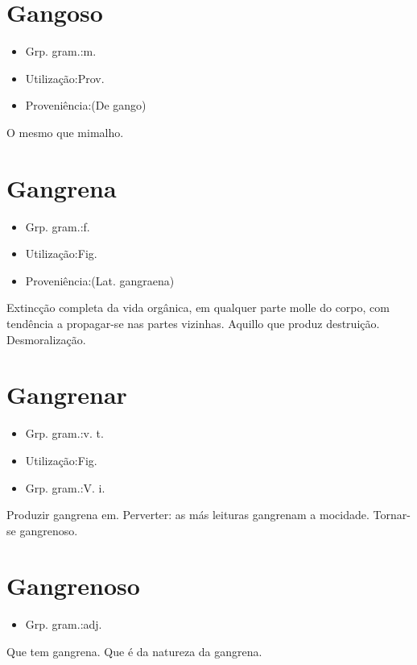 \section{Gangoso}
\begin{itemize}
\item {Grp. gram.:m.}
\end{itemize}
\begin{itemize}
\item {Utilização:Prov.}
\end{itemize}
\begin{itemize}
\item {Proveniência:(De \textunderscore gango\textunderscore )}
\end{itemize}
O mesmo que \textunderscore mimalho\textunderscore .
\section{Gangrena}
\begin{itemize}
\item {Grp. gram.:f.}
\end{itemize}
\begin{itemize}
\item {Utilização:Fig.}
\end{itemize}
\begin{itemize}
\item {Proveniência:(Lat. \textunderscore gangraena\textunderscore )}
\end{itemize}
Extincção completa da vida orgânica, em qualquer parte molle do corpo, com tendência a propagar-se nas partes vizinhas.
Aquillo que produz destruição.
Desmoralização.
\section{Gangrenar}
\begin{itemize}
\item {Grp. gram.:v. t.}
\end{itemize}
\begin{itemize}
\item {Utilização:Fig.}
\end{itemize}
\begin{itemize}
\item {Grp. gram.:V. i.}
\end{itemize}
Produzir gangrena em.
Perverter: \textunderscore as más leituras gangrenam a mocidade\textunderscore .
Tornar-se gangrenoso.
\section{Gangrenoso}
\begin{itemize}
\item {Grp. gram.:adj.}
\end{itemize}
Que tem gangrena.
Que é da natureza da gangrena.
